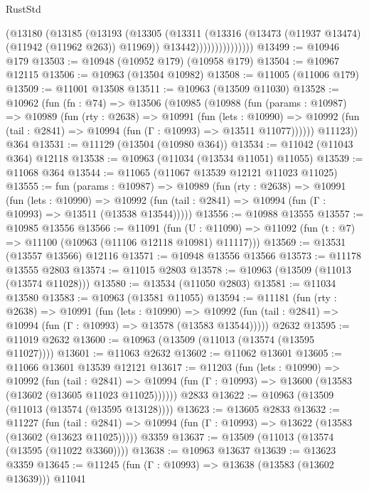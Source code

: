 \begin{lexlean}{RustStd}
\begin{coremodule}
{\begin{coremodule}
{{{{{{{{{{{{{{{{{{{{{{{{{{{{{{{{{                        (@13180
                          (@13185
                            (@13193
                              (@13305
                                (@13311
                                  (@13316 (@13473 (@11937 @13474) (@11942 (@11962 @263)) @11969))
                                  @13442)))))))))))))))
@13499 := @10946 @179
@13503 := @10948 (@10952 @179) (@10958 @179)
@13504 := @10967 @12115
@13506 := @10963 (@13504 @10982)
@13508 := @11005 (@11006 @179)
@13509 := @11001 @13508
@13511 := @10963 (@13509 @11030)
@13528 := @10962
    (fun (fn : @74) =>
    @13506
      (@10985
        (@10988
          (fun (params : @10987) =>
          @10989
            (fun (rty : @2638) =>
            @10991
              (fun (lets : @10990) =>
              @10992 (fun (tail : @2841) => @10994 (fun (Γ : @10993) => @13511 @11077))))))
        @11123))
    @364
@13531 := @11129 (@13504 (@10980 @364))
@13534 := @11042 (@11043 @364) @12118
@13538 := @10963 (@11034 (@13534 @11051) @11055)
@13539 := @11068 @364
@13544 := @11065 (@11067 @13539 @12121 @11023 @11025)
@13555 := fun (params : @10987) =>
  @10989
    (fun (rty : @2638) =>
    @10991
      (fun (lets : @10990) =>
      @10992 (fun (tail : @2841) => @10994 (fun (Γ : @10993) => @13511 (@13538 @13544)))))
@13556 := @10988 @13555
@13557 := @10985 @13556
@13566 := @11091
    (fun (U : @11090) => @11092 (fun (t : @7) => @11100 (@10963 (@11106 @12118 @10981) @11117)))
@13569 := @13531 (@13557 @13566) @12116
@13571 := @10948 @13556 @13566
@13573 := @11178 @13555 @2803
@13574 := @11015 @2803
@13578 := @10963 (@13509 (@11013 (@13574 @11028)))
@13580 := @13534 (@11050 @2803)
@13581 := @11034 @13580
@13583 := @10963 (@13581 @11055)
@13594 := @11181
    (fun (rty : @2638) =>
    @10991
      (fun (lets : @10990) =>
      @10992 (fun (tail : @2841) => @10994 (fun (Γ : @10993) => @13578 (@13583 @13544)))))
    @2632
@13595 := @11019 @2632
@13600 := @10963 (@13509 (@11013 (@13574 (@13595 @11027))))
@13601 := @11063 @2632
@13602 := @11062 @13601
@13605 := @11066 @13601 @13539 @12121
@13617 := @11203
    (fun (lets : @10990) =>
    @10992
      (fun (tail : @2841) =>
      @10994 (fun (Γ : @10993) => @13600 (@13583 (@13602 (@13605 @11023 @11025))))))
    @2833
@13622 := @10963 (@13509 (@11013 (@13574 (@13595 @13128))))
@13623 := @13605 @2833
@13632 := @11227
    (fun (tail : @2841) => @10994 (fun (Γ : @10993) => @13622 (@13583 (@13602 (@13623 @11025)))))
    @3359
@13637 := @13509 (@11013 (@13574 (@13595 (@11022 @3360))))
@13638 := @10963 @13637
@13639 := @13623 @3359
@13645 := @11245 (fun (Γ : @10993) => @13638 (@13583 (@13602 @13639))) @11041
}}}}}}}}}}}}}}}}}}}}}}}}}}}}}}}}}
\end{coremodule}}
\end{coremodule}
\end{lexlean}
